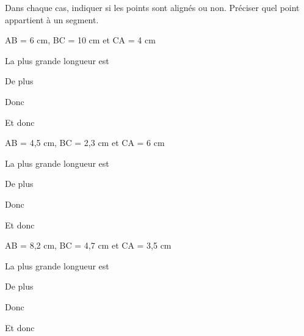 \documentclass[a4paper]{book}
\begin{document}
    \begin{exemple}
        Dans chaque cas, indiquer si les points sont alignés ou non. Préciser quel point appartient à un segment.

        \bigskip

        \begin{minipage}{0.3\linewidth}
            \small{AB = 6 cm, BC = 10 cm et CA = 4 cm}

            \bigskip

            La plus grande longueur est \points[14]

            \medskip 
            
            De plus \points[10]

            \bigskip

            Donc \points[10]

            \bigskip

            Et donc \points[10]

            \vspace{1cm}
        \end{minipage}
        \hfill
        \vline
        \hfill
        \begin{minipage}{0.3\linewidth}
            \small{AB = 4,5 cm, BC = 2,3 cm et CA = 6 cm}

            \bigskip

            La plus grande longueur est \points[14]

            \medskip 
            
            De plus \points[10]

            \bigskip

            Donc \points[10]

            \bigskip

            Et donc \points[10]    

            \vspace{1cm}
        \end{minipage}
        \hfill
        \vline
        \hfill
        \begin{minipage}{0.3\linewidth}

            \small{AB = 8,2 cm, BC = 4,7 cm et CA = 3,5 cm}

            \bigskip

            La plus grande longueur est \points[14]

            \medskip 
            
            De plus \points[10]

            \bigskip

            Donc \points[10]

            \bigskip

            Et donc \points[10]

            \vspace{0.5cm}
        \end{minipage}     
    \end{exemple}
\end{document}
